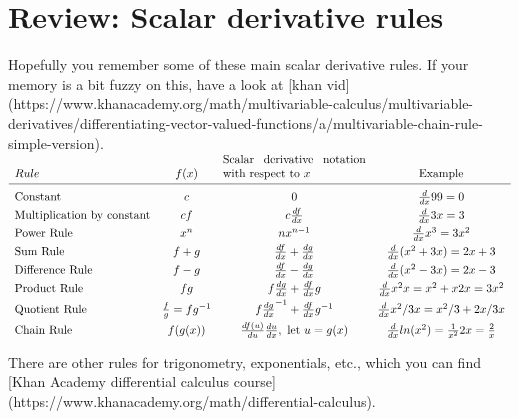 \documentclass[11pt]{article}
\begin{document}
\section{Review: Scalar derivative rules}

Hopefully you remember some of these main scalar derivative rules. If your memory is a bit fuzzy on this, have a look at [khan vid](https://www.khanacademy.org/math/multivariable-calculus/multivariable-derivatives/differentiating-vector-valued-functions/a/multivariable-chain-rule-simple-version).

$
\begin{array}{lccc}
Rule & f(x) & \text{\parbox[t][0mm][b]{43mm}{Scalar derivative notation with respect to $x$}} & \text{Example}\\
\\[\dimexpr-\normalbaselineskip+2pt]
\hline
\\[\dimexpr-\normalbaselineskip+5pt]
\vspace{1mm}
\text{Constant} & c & 0 &  \frac{d}{dx}99 = 0\\
\vspace{1mm}
\text{Multiplication by constant} &	cf	&c \frac{df}{dx} & \frac{d}{dx}3x = 3\\
\vspace{1mm}
\text{Power Rule}	& x^n	& nx^{n-1} & \frac{d}{dx}x^3 = 3x^2\\
\vspace{1mm}
\text{Sum Rule}	& f + g	& \frac{df}{dx} + \frac{dg}{dx} & \frac{d}{dx} (x^2 + 3x) = 2x + 3\\
\vspace{1mm}
\text{Difference Rule}	& f - g	& \frac{df}{dx} - \frac{dg}{dx} & \frac{d}{dx}(x^2 - 3x) = 2x - 3\\
\vspace{1mm}
\text{Product Rule}	& fg & f \frac{dg}{dx} + \frac{df}{dx} g & \frac{d}{dx}x^2x = x^2 + x2x = 3x^2\\
\vspace{1mm}
\text{Quotient Rule}	& \frac{f}{g} = fg^{-1} & f \frac{dg}{dx}^{-1} + \frac{df}{dx} g^{-1} & \frac{d}{dx}x^2 / 3x = x^2/3 + 2x / 3x\\
\text{Chain Rule}	 & f(g(x)) &   \frac{df(u)}{du}\frac{du}{dx}, \text{ let } u=g(x) & \frac{d}{dx} ln(x^2) = \frac{1}{x^2}2x = \frac{2}{x}\\
\end{array}
$

There are other rules for trigonometry, exponentials, etc., which you can find [Khan Academy differential calculus course](https://www.khanacademy.org/math/differential-calculus).
\end{document}
